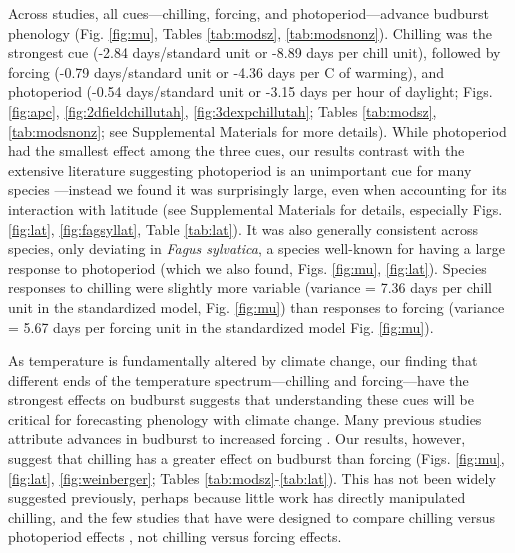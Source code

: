 \documentclass{article}
\begin{document}
\par Across studies, all cues---chilling, forcing, and photoperiod---advance budburst phenology (Fig. \ref{fig:mu}, Tables \ref{tab:modsz}, \ref{tab:modsnonz}). Chilling was the strongest cue (-2.84 days/standard unit or -8.89 days per chill unit), followed by forcing (-0.79 days/standard unit or -4.36 days per \degree C of warming), and photoperiod (-0.54 days/standard unit or -3.15 days per hour of daylight; Figs. \ref{fig:apc}, \ref{fig:2dfieldchillutah}, \ref{fig:3dexpchillutah}; Tables \ref{tab:modsz}, \ref{tab:modsnonz}; see Supplemental Materials for more details). While photoperiod had the smallest effect among the three cues, our results contrast with the extensive literature suggesting photoperiod is an unimportant cue for many species \emph{\citep{zohner2016,koerner2010a}}---instead we found it was surprisingly large, even when accounting for its interaction with latitude (see Supplemental Materials for details, especially Figs. \ref{fig:lat}, \ref{fig:fagsyllat}, Table \ref{tab:lat}). It was also generally consistent across species, only deviating in \emph{Fagus sylvatica}, a species well-known for having a large response to photoperiod (which we also found, Figs. \ref{fig:mu}, \ref{fig:lat}). Species responses to chilling were slightly more variable (variance = 7.36 days per chill unit in the standardized model, Fig. \ref{fig:mu}) than responses to forcing (variance = 5.67 days per forcing unit in the standardized model Fig. \ref{fig:mu}).
\par As temperature is fundamentally altered by climate change, our finding that different ends of the temperature spectrum---chilling and forcing---have the strongest effects on budburst suggests that understanding these cues will be critical for forecasting phenology with climate change. Many previous studies attribute advances in budburst to increased forcing \emph{\citep{menzel2006,harrington2015,Basler:2014aa,bradley1999}}.
Our results, however, suggest that chilling has a greater effect on budburst than forcing (Figs. \ref{fig:mu}, \ref{fig:lat}, \ref{fig:weinberger}; Tables \ref{tab:modsz}-\ref{tab:lat}). This has not been widely suggested previously, perhaps because little work has directly manipulated chilling, and the few studies that have were designed to compare chilling versus photoperiod effects \emph{\citep[e.g.,][]{zohner2016,Basler:2014aa,Caffarra:2011qf,Laube:2014a}}, not chilling versus forcing effects. 
\end{document}
